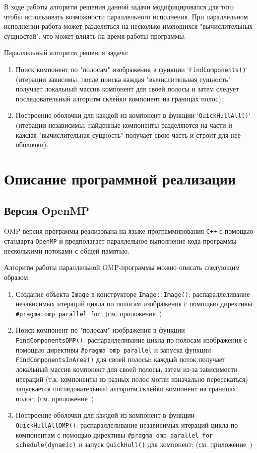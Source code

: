 \documentclass[12pt]{article}
\begin{document}
В ходе работы алгоритм решения данной задачи модифицировался для того чтобы использовать возможности параллельного исполнения. При параллельном исполнении работа может разделяться на несколько имеющихся "вычислительных сущностей", что может влиять на время работы программы.

Параллельный алгоритм решения задачи:
\begin{enumerate}
    \item Поиск компонент по "полосам" изображения в функции `\texttt{FindComponents()}` (итерации зависимы, после поиска каждая "вычислительная сущность" получает локальный массив компонент для своей полосы и затем следует последовательный алгоритм склейки компонент на границах полос);
    \item Построение оболочки для каждой из компонент в функции `\texttt{QuickHullAll()}` (итерации независимы, найденные компоненты разделяются на части и каждая "вычислительная сущность" получает свою часть и строит для неё оболочки).
\end{enumerate}

\newpage

\section{Описание программной реализации}
\subsection{Версия OpenMP}

OMP-версия программы реализована на языке программирования \texttt{C++} с помощью стандарта \texttt{OpenMP} и предполагает параллельное выполнение кода программы несколькими потоками с общей памятью.

Алгоритм работы параллельной OMP-программы можно описать следующим образом:

\begin{enumerate}
    \item Создание объекта \texttt{Image} в конструкторе \texttt{Image::Image()}: распараллеливание независимых итераций цикла по полосам изображения с помощью директивы \texttt{\#pragma omp parallel for}; (см. приложение~)
    \item Поиск компонент по "полосам" изображения в функции \texttt{FindComponentsOMP()}: распараллеливание цикла по полосам изображения с помощью директивы \texttt{\#pragma omp parallel} и запуска функции \texttt{FindComponentsInArea()} для своей полосы; каждый поток получает локальный массив компонент для своей полосы, затем из-за зависимости итераций (т.к. компоненты из разных полос могли изначально пересекаться) запускается последовательный алгоритм склейки компонент на границах полос; (см. приложение~)
    \item Построение оболочки для каждой из компонент в функции \texttt{QuickHullAllOMP()}: распараллеливание независимых итераций цикла по компонентам с помощью директивы \texttt{\#pragma omp parallel for schedule(dynamic)} и запуск \texttt{QuickHull()} для компонент; (см. приложение~)
\end{enumerate}
\end{document}
